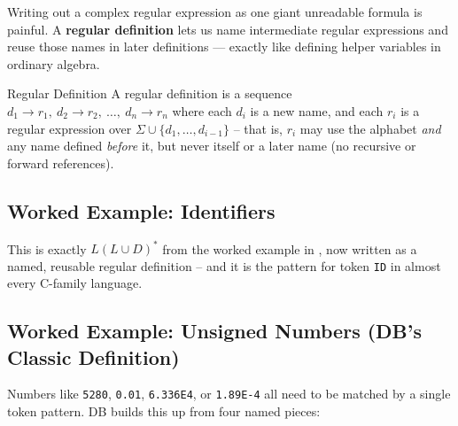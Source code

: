 \documentclass[full-course-notes.tex]{subfiles}
\begin{document}
\dbtag Writing out a complex regular expression as one giant unreadable formula is painful. A
\textbf{regular definition} lets us name intermediate regular expressions and reuse those names
in later definitions --- exactly like defining helper variables in ordinary algebra.

\begin{defbox}{Regular Definition}
A regular definition is a sequence $d_1 \to r_1,\ d_2 \to r_2,\ \dots,\ d_n \to r_n$ where each
$d_i$ is a new name, and each $r_i$ is a regular expression over $\Sigma \cup \{d_1,\dots,
d_{i-1}\}$ -- that is, $r_i$ may use the alphabet \emph{and} any name defined \emph{before} it,
but never itself or a later name (no recursive or forward references).
\end{defbox}

\subsection{Worked Example: Identifiers}
\label{sec:l4-worked-example-identifiers}

\begin{center}
\end{center}

This is exactly $L(L\cup D)^{*}$ from the worked example in ,
now written as a named, reusable regular definition -- and it is the pattern for token
\texttt{ID} in almost every C-family language.

\subsection{Worked Example: Unsigned Numbers (DB's Classic Definition)}
\label{sec:l4-worked-example-numbers}

Numbers like \texttt{5280}, \texttt{0.01}, \texttt{6.336E4}, or \texttt{1.89E-4} all need to be
matched by a single token pattern. DB builds this up from four named pieces:
\end{document}
